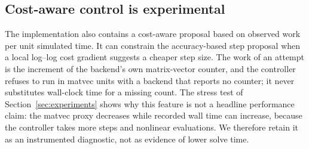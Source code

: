 \subsection{Cost-aware control is experimental}

The implementation also contains a cost-aware proposal based on observed work
per unit simulated time.  It can constrain the accuracy-based step proposal
when a local log--log cost gradient suggests a cheaper step size.  The work of
an attempt is the increment of the backend's own matrix-vector counter, and
the controller refuses to run in matvec units with a backend that reports no
counter; it never substitutes wall-clock time for a missing count.  The stress
test of Section~\ref{sec:experiments} shows why this feature is not a headline
performance claim: the matvec proxy decreases while recorded wall time can
increase, because the controller takes more steps and nonlinear evaluations.
We therefore retain it as an instrumented diagnostic, not as evidence of lower
solve time.
